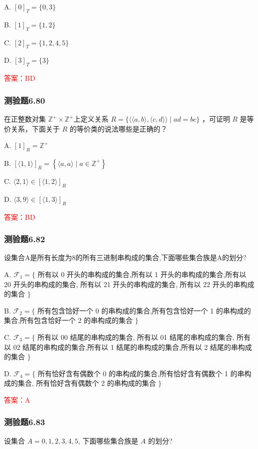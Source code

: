 \documentclass[UTF8, heading=true]{ctexart}
\begin{document}
A. $[0]_T=\{0,3\}$

B. $[1]_T=\{1,2\}$

C. $[2]_T=\{1,2,4,5\}$

D. $[3]_T=\{3\}$

\textcolor{red}{答案：BD}

\subsubsection{测验题6.80}

在正整数对集 $\mathbb{Z}^{+} \times \mathbb{Z}^{+}$上定义关系 $R=\{\langle\langle a, b\rangle,\langle c, d\rangle\rangle \mid a d=b c\}$ ，可证明 $R$ 是等价关系，下面关于 $R$ 的等价类的说法哪些是正确的？

A. $[1]_R=\mathbb{Z}^{+}$

B. $[\langle 1,1\rangle]_R=\left\{\langle a, a\rangle \mid a \in \mathbb{Z}^{+}\right\}$

C. $\langle 2,1\rangle \in[\langle 1,2\rangle]_R$

D. $\langle 3,9\rangle \in[\langle 1,3\rangle]_R$

\textcolor{red}{答案：BD}

\subsubsection{测验题6.82}

设集合A是所有长度为8的所有三进制串构成的集合,下面哪些集合族是A的划分?

A. $\mathcal{F}_1=\{$ 所有以 0 开头的串构成的集合,所有以 1 开头的串构成的集合,所有以 20 开头的串构成的集合, 所有以 21 开头的串构成的集合, 所有以 22 开头的串构成的集合 $\}$

B. $\mathcal{F}_2=\{$ 所有包含饸好一个 0 的串构成的集合,所有包含恰好一个 1 的串构成的集合,所有包含恰好一个 2 的串构成的集合 $\}$

C. $\mathcal{F}_3=\{$ 所有以 00 结尾的串构成的集合, 所有以 01 结尾的串构成的集合, 所有以 02 结尾的串构成的集合,所有以 1 结尾的串构成的集合,所有以 2 结尾的串构成的集合 $\}$

D. $\mathcal{F}_4=\{$ 所有恰好含有偶数个 0 的串构成的集合,所有恰好含有偶数个 1 的串构成的集合, 所有恰好含有偶数个 2 的串构成的集合 $\}$

\textcolor{red}{答案：A}

\subsubsection{测验题6.83}
设集合 $A={0,1,2,3,4,5}$, 下面哪些集合族是 $A$ 的划分?
\end{document}
